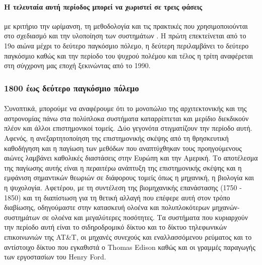 \documentclass[a4paper,12pt,twoside]{report}
\begin{document}
{			\paragraph{Η τελευταία αυτή περίοδος μπορεί να χωριστεί σε τρεις φάσεις }{με κριτήριο την ωρίμανση, τη μεθοδολογία και τις πρακτικές που χρησιμοποιούνται στο σχεδιασμό και την υλοποίηση των συστημάτων \cite{HistoricalPerspectivesOnSystemsThinkingInEngineering, OriginAndEvolutionOfSystemsEngineering}. Η πρώτη επεκτείνεται από το 19ο αιώνα μέχρι το δεύτερο παγκόσμιο πόλεμο, η δεύτερη περιλαμβάνει το δεύτερο παγκόσμιο καθώς και την περίοδο του  ψυχρού πολέμου και τέλος η τρίτη αναφέρεται στη σύγχρονη μας εποχή ξεκινώντας από το 1990.
			}
		
		\subsubsection{1800 έως δεύτερο παγκόσμιο πόλεμο}
			\paragraph{}{Συνοπτικά, μπορούμε να αναφέρουμε ότι το μονοπώλιο της αρχιτεκτονικής και της αστρονομίας πάνω στα πολύπλοκα συστήματα καταρρίπτεται και μερίδιο διεκδικούν πλέον και άλλοι επιστημονικοί τομείς. Δύο γεγονότα στιγματίζουν την περίοδο αυτή. Αφενός, η ανεξαρτητοποίηση της επιστημονικής σκέψης από τη θρησκευτική καθοδήγηση και η παγίωση των μεθόδων που αναπτύχθηκαν τους προηγούμενους αιώνες λαμβάνει καθολικές διαστάσεις στην Ευρώπη και την Αμερική. Το αποτέλεσμα της παγίωσης αυτής είναι η περαιτέρω ανάπτυξη της επιστημονικής σκέψης και η εμφάνιση σημαντικών θεωριών σε διάφορους τομείς όπως η μηχανική, η βιολογία και η ψυχολογία. Αφετέρου, με τη συντέλεση της βιομηχανικής επανάστασης (1750 - 1850) και τη διαπίστωση για τη θετική αλλαγή που επέφερε αυτή στον τρόπο διαβίωσης, οδηγούμαστε στην κατασκευή ολοένα και πολυπλοκότερων μηχανών-συστημάτων σε ολοένα και μεγαλύτερες ποσότητες. Τα συστήματα που κυριαρχούν την περίοδο αυτή είναι το σιδηροδρομικό δίκτυο και το δίκτυο τηλεφωνικών επικοινωνιών της AT{\&}T, οι μηχανές συνεχούς και εναλλασσόμενου ρεύματος και το αντίστοιχο δίκτυο που εγκαθιστά ο Thomas Edison καθώς και οι γραμμές παραγωγής των εργοστασίων του Henry Ford.
			}
			
}
\end{document}
